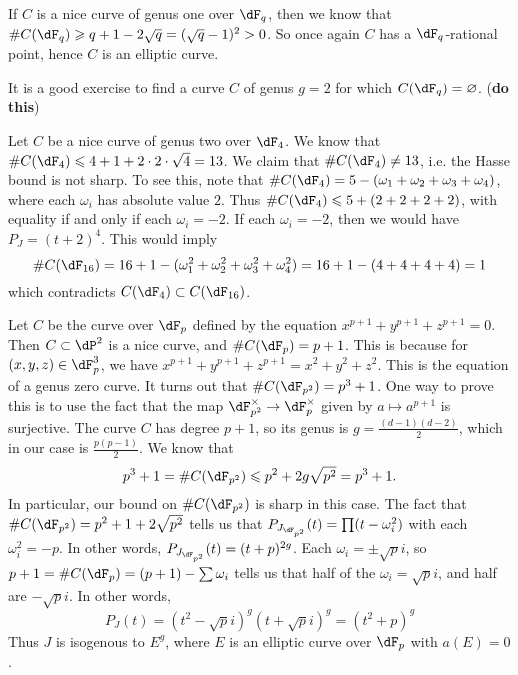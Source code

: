 \begin{example}
If $C$ is a nice curve of genus one over $\dF_q$, then we know that 
$\# C(\dF_q) \geqslant q+1-2\sqrt q = (\sqrt q-1)^2 > 0$. So once again $C$ has 
a $\dF_q$-rational point, hence $C$ is an elliptic curve. 
\end{example}

It is a good exercise to find a curve $C$ of genus $g=2$ for which 
$C(\dF_q)=\varnothing$. (\textbf{do this})

\begin{example}
Let $C$ be a nice curve of genus two over $\dF_4$. We know that 
$\# C(\dF_4) \leqslant 4+1+2\cdot 2\cdot \sqrt 4 = 13$. We claim that 
$\# C(\dF_4) \ne 13$, i.e. the Hasse bound is not sharp. To see this, note 
that $\# C(\dF_4) = 5 - (\omega_1+\omega_2+\omega_3+\omega_4)$, where each 
$\omega_i$ has absolute value $2$. Thus 
$\# C(\dF_4) \leqslant 5 + (2+2+2+2)$, with equality if and only if each 
$\omega_i=-2$. If each $\omega_i=-2$, then we would have 
$P_J=(t+2)^4$. This would imply 
\[
  \# C(\dF_{16}) = 16+1-(\omega_1^2+\omega_2^2+\omega_3^2+\omega_4^2) = 16+1-(4+4+4+4)=1
\]
which contradicts $C(\dF_4)\subset C(\dF_{16})$. 
\end{example}

\begin{example}
Let $C$ be the curve over $\dF_p$ defined by the equation 
$x^{p+1}+y^{p+1}+z^{p+1}=0$. Then $C\subset \dP^2$ is a nice curve, and 
$\# C(\dF_p)=p+1$. This is because for $(x,y,z)\in \dF_p^3$, we have 
$x^{p+1}+y^{p+1}+z^{p+1}=x^2+y^2+z^2$. This is the equation of a genus zero 
curve. It turns out that $\# C(\dF_{p^2}) = p^3+1$. One way to prove this is 
to use the fact that the map $\dF_{p^2}^\times \to \dF_p^\times$ given by 
$a\mapsto a^{p+1}$ is surjective. The curve $C$ has degree 
$p+1$, so its genus is $g=\frac{(d-1)(d-2)}{2}$, which in our case is 
$\frac{p(p-1)}{2}$. We know that 
\[
  p^3+1 = \# C(\dF_{p^2}) \leqslant p^2+2 g\sqrt{p^2} = p^3+1 \text{.}
\]
In particular, our bound on $\# C(\dF_{p^2})$ is sharp in this case. The fact 
that $\# C(\dF_{p^2}) = p^2+1+2\sqrt{p^2}$ tells us that 
$P_{J_{\dF_{p^2}}}(t) = \prod (t-\omega_i^2)$ with each $\omega_i^2=-p$. In 
other words, $P_{J_{\dF_{p^2}}}(t) = (t+p)^{2g}$. Each 
$\omega_i = \pm \sqrt p i$, so $p+1=\# C(\dF_p) = (p+1) - \sum \omega_i$ 
tells us that half of the $\omega_i=\sqrt p i$, and half are 
$-\sqrt p i$. In other words, 
\[
  P_J(t) = (t^2-\sqrt p i)^g (t+\sqrt p i)^g = (t^2+p)^g
\]
Thus $J$ is isogenous to $E^g$, where $E$ is an elliptic curve over $\dF_p$ 
with $a(E)=0$. 
\end{example}










